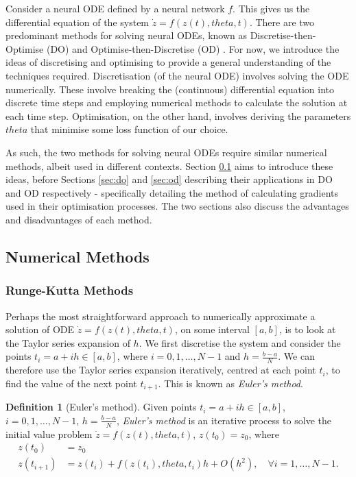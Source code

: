 \documentclass[a4paper,11pt,titlepage]{article}
\def\theta{theta}%
\theoremstyle{definition}
\newtheorem{definition}{Definition}[section]
\theoremstyle{plain}
\theoremstyle{remark}
\begin{document}
Consider a neural ODE defined by a neural network $f$. This gives us the differential equation of the system $\dot{z}=f(z(t),\theta,t)$. There are two predominant methods for solving neural ODEs, known as Discretise-then-Optimise (DO) and Optimise-then-Discretise (OD) \cite{kidger2022neural}. For now, we introduce the ideas of discretising and optimising to provide a general understanding of the techniques required. Discretisation (of the neural ODE) involves solving the ODE numerically. These involve breaking the (continuous) differential equation into discrete time steps and employing numerical methods to calculate the solution at each time step. Optimisation, on the other hand, involves deriving the parameters $\theta$ that minimise some loss function of our choice. 

As such, the two methods for solving neural ODEs require similar numerical methods, albeit used in different contexts. Section \ref{sec:nummethods} aims to introduce these ideas, before Sections \ref{sec:do} and \ref{sec:od} describing their applications in DO and OD respectively - specifically detailing the method of calculating gradients used in their optimisation processes. The two sections also discuss the advantages and disadvantages of each method.

\subsection{Numerical Methods}
\label{sec:nummethods}

\subsubsection{Runge-Kutta Methods}
\label{sec:rungekutta}

Perhaps the most straightforward approach to numerically approximate a solution of ODE $\dot{z}= f(z(t), \theta,t)$, on some interval $\left[a, b\right]$, is to look at the Taylor series expansion of $h$. We first discretise the system and consider the points $t_i = a + ih \in \left[a, b\right]$, where $i = 0, 1, \dots, N - 1$ and $h = \frac{b-a}{N}$. We can therefore use the Taylor series expansion iteratively, centred at each point $t_i$, to find the value of the next point $t_{i + 1}$. This is known as \textit{Euler's method}.

\begin{definition}[Euler's method]
    Given points $t_i = a + ih \in \left[a, b\right]$, $i = 0, 1, \dots, N - 1$, $h = \frac{b-a}{N}$, \textit{Euler's method} is an iterative process to solve the initial value problem $\dot{z}= f(z(t), \theta,t)$, $z(t_0) = z_0$, where
    \begin{align*}
        z(t_0) &= z_0 \\
        z(t_{i+1}) &= z(t_i) + f(z(t_{i}), \theta, t_i)h + O(h^2),\quad\forall i = 1, \dots, N - 1.
    \end{align*}
\end{definition}
\end{document}
